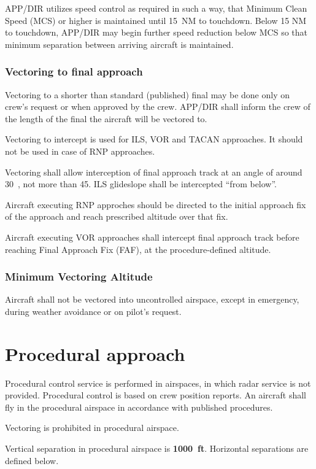 APP/DIR utilizes speed control as required in such a way, that Minimum Clean
Speed (MCS) or higher is maintained until 15~NM to touchdown. Below 15 NM to
touchdown, APP/DIR may begin further speed reduction below MCS so that minimum
separation between arriving aircraft is maintained.

\subsubsection{Vectoring to final approach}

Vectoring to a shorter than standard (published) final may be done only on
crew's request or when approved by the crew. APP/DIR shall inform the crew of
the length of the final the aircraft will be vectored to.

Vectoring to intercept is used for ILS, VOR and TACAN approaches. It should not
be used in case of RNP approaches.

Vectoring shall allow interception of final approach track at an angle of around
30~\degree, not more than 45{\degree}. ILS glideslope shall be intercepted
``from below''.

Aircraft executing RNP approches should be directed to the initial approach fix
of the approach and reach prescribed altitude over that fix.

Aircraft executing VOR approaches shall intercept final approach track before
reaching Final Approach Fix (FAF), at the procedure-defined altitude.

\subsubsection{Minimum Vectoring Altitude} Aircraft shall not be vectored into
uncontrolled airspace, except in emergency, during weather avoidance or on
pilot's request.

\section{Procedural approach}%
\label{sec:app:procedural}

Procedural control service is performed in airspaces, in which radar service is
not provided. Procedural control is based on crew position reports. An aircraft
shall fly in the procedural airspace in accordance with published procedures.

Vectoring is prohibited in procedural airspace.

Vertical separation in procedural airspace is \textbf{1000~ft}. Horizontal
separations are defined below.

